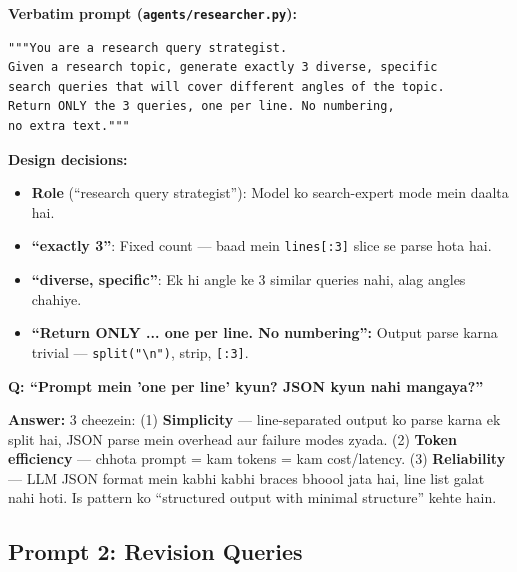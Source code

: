 \begin{codestorybox}
\textbf{Verbatim prompt (\texttt{agents/researcher.py}):}

\begin{lstlisting}[style=pythonstyle, caption={QUERY\_GEN\_PROMPT --- asli code se}]
"""You are a research query strategist.
Given a research topic, generate exactly 3 diverse, specific
search queries that will cover different angles of the topic.
Return ONLY the 3 queries, one per line. No numbering,
no extra text."""
\end{lstlisting}

\textbf{Design decisions:}
\begin{itemize}
\item \textbf{Role} (``research query strategist''): Model ko search-expert mode mein daalta hai.
\item \textbf{``exactly 3''}: Fixed count --- baad mein \texttt{lines[:3]} slice se parse hota hai.
\item \textbf{``diverse, specific''}: Ek hi angle ke 3 similar queries nahi, alag angles chahiye.
\item \textbf{``Return ONLY ... one per line. No numbering'':} Output parse karna trivial --- \texttt{split("\textbackslash n")}, strip, \texttt{[:3]}.
\end{itemize}
\end{codestorybox}

\begin{interviewbox}
\textbf{Q: ``Prompt mein 'one per line' kyun? JSON kyun nahi mangaya?''}

\textbf{Answer:} 3 cheezein: (1) \textbf{Simplicity} --- line-separated output ko parse karna ek split hai, JSON parse mein overhead aur failure modes zyada. (2) \textbf{Token efficiency} --- chhota prompt = kam tokens = kam cost/latency. (3) \textbf{Reliability} --- LLM JSON format mein kabhi kabhi braces bhoool jata hai, line list galat nahi hoti. Is pattern ko ``structured output with minimal structure'' kehte hain.
\end{interviewbox}

\subsection{Prompt 2: Revision Queries}

